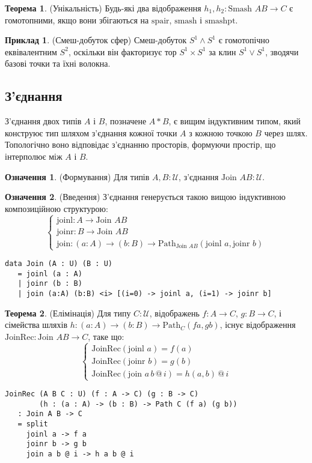 \documentclass{article}
\theoremstyle{definition}
\newtheorem{theorem}{Теорема}
\newtheorem{definition}{Означення}
\newtheorem{example}{Приклад}
\begin{document}
\begin{theorem} (Унікальність)
Будь-які два відображення \( h_1, h_2 : \text{Smash } A B \to C \) є гомотопними,
якщо вони збігаються на \( \text{spair} \), \( \text{smash} \) і \( \text{smashpt} \).
\end{theorem}

\begin{example} (Смеш-добуток сфер)
Смеш-добуток \( S^1 \wedge S^1 \) є гомотопічно еквівалентним \( S^2 \),
оскільки він факторизує тор \( S^1 \times S^1 \) за клин \( S^1 \vee S^1 \),
зводячи базові точки та їхні волокна.
\end{example}

\newpage
\subsection{З’єднання}
З’єднання двох типів \( A \) і \( B \), позначене \( A * B \),
є вищим індуктивним типом, який конструює тип шляхом
з’єднання кожної точки \( A \) з кожною точкою \( B \) через шлях.
Топологічно воно відповідає з’єднанню просторів, формуючи
простір, що інтерполює між \( A \) і \( B \).

\begin{definition} (Формування)
Для типів \( A, B : \mathcal{U} \), з’єднання \( \text{Join } A B : \mathcal{U} \).
\end{definition}

\begin{definition} (Введення)
З’єднання генерується такою вищою індуктивною композиційною структурою:
\[
\begin{cases}
\text{joinl} : A \to \text{Join } A B \\
\text{joinr} : B \to \text{Join } A B \\
\text{join} : (a : A) \to (b : B) \to \text{Path}_{\text{Join } A B} (\text{joinl } a, \text{joinr } b)
\end{cases}
\]
\begin{lstlisting}
data Join (A : U) (B : U)
   = joinl (a : A)
   | joinr (b : B)
   | join (a:A) (b:B) <i> [(i=0) -> joinl a, (i=1) -> joinr b]
\end{lstlisting}
\end{definition}

\begin{theorem} (Елімінація)
Для типу \( C : \mathcal{U} \), відображень \( f : A \to C \), \( g : B \to C \),
і сімейства шляхів \( h : (a : A) \to (b : B) \to \text{Path}_C (f a, g b) \),
існує відображення \( \text{JoinRec} : \text{Join } A B \to C \), таке що:
\[
\begin{cases}
\text{JoinRec}(\text{joinl } a) = f(a) \\
\text{JoinRec}(\text{joinr } b) = g(b) \\
\text{JoinRec}(\text{join } a \, b \, @ \, i) = h(a, b) \, @ \, i
\end{cases}
\]
\begin{lstlisting}
JoinRec (A B C : U) (f : A -> C) (g : B -> C)
        (h : (a : A) -> (b : B) -> Path C (f a) (g b))
   : Join A B -> C
   = split
     joinl a -> f a
     joinr b -> g b
     join a b @ i -> h a b @ i
\end{lstlisting}
\end{theorem}
\end{document}
